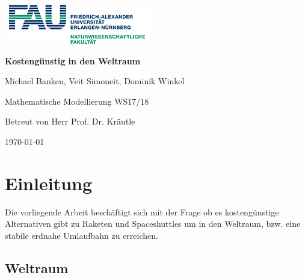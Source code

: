 \documentclass[a4paper, 10pt]{report}
\begin{document}
\begin{titlepage}
\centering
\includegraphics[scale=1]{FAU-nat-logo.png}\par
\vspace{2cm}
{\huge\bfseries Kostengünstig in den Weltraum\par}
\vspace{1cm}
{\Large Michael Banken, Veit Simoneit, Dominik Winkel\par}
\vspace{2cm}
{\Large Mathematische Modellierung WS17/18\par}
\vspace{0.5cm}
{Betreut von Herr Prof. Dr. Kräutle\par}
\vfill
{\Large \today\par}

\end{titlepage}

\tableofcontents


\chapter{Einleitung}


Die vorliegende Arbeit beschäftigt sich mit der Frage ob es kostengünstige Alternativen gibt zu Raketen und Spaceshuttles um in den Weltraum, bzw. eine stabile erdnahe Umlaufbahn zu erreichen.\\
\section{Weltraum}
\end{document}
